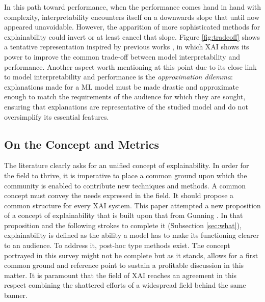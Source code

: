 \documentclass[final]{elsarticle}
\begin{document}
In this path toward performance, when the performance comes hand in hand with complexity, interpretability encounters itself on a downwards slope that until now appeared unavoidable. However, the apparition of more sophisticated methods for explainability could invert or at least cancel that slope. Figure \ref{fig:tradeoff} shows a tentative representation inspired by previous works \cite{gunning2017explainable}, in which XAI shows its power to improve the common trade-off between model interpretability and performance. {\color{black}Another aspect worth mentioning at this point due to its close link to model interpretability and performance is the \emph{approximation dilemma}: explanations made for a ML model must be made drastic and approximate enough to match the requirements of the audience for which they are sought, ensuring that explanations are representative of the studied model and do not oversimplify its essential features.}

\subsection{On the Concept and Metrics} \label{ssec:concepts_and_metrics}

The literature clearly asks for an unified concept of explainability. In order for the field to thrive, it is imperative to place a common ground upon which the community is enabled to contribute new techniques and methods. A common concept must convey the needs expressed in the field. It should propose a common structure for every XAI system. This paper attempted a new proposition of a concept of explainability that is built upon that from Gunning \cite{gunning2017explainable}. In that proposition and the following strokes to complete it (Subsection \ref{sec:what}), explainability is defined as the ability a model has to make its functioning clearer to an audience. To address it, post-hoc type methods exist. The concept portrayed in this survey might not be complete but as it stands, allows for a first common ground and reference point to sustain a profitable discussion in this matter. It is paramount that the field of XAI reaches an agreement in this respect combining the shattered efforts of a widespread field behind the same banner.
\end{document}
